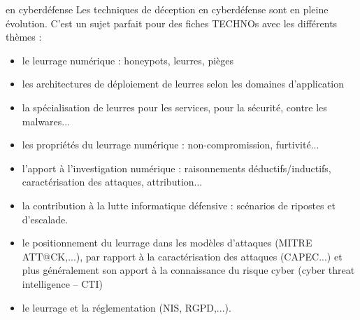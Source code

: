 \begin{warningbox}{ en cyberdéfense}
Les techniques de déception en cyberdéfense sont en pleine évolution. C'est un sujet parfait pour des fiches TECHNOs avec les différents thèmes  :
\begin{itemize}
  \item le leurrage numérique : honeypots, leurres, pièges
  \item 	les architectures de déploiement de leurres selon les domaines d'application
  \item 	la spécialisation de leurres pour les services, pour la sécurité, contre les malwares...
  \item 	les propriétés du leurrage numérique :  non-compromission,  furtivité...
  \item 	l'apport à l'investigation numérique : raisonnements déductifs/inductifs, caractérisation des attaques, attribution...
  \item 	la contribution à la lutte informatique défensive : scénarios de ripostes et d'escalade.
  \item 	le positionnement du leurrage dans les modèles d'attaques (MITRE ATT@CK,...), par rapport à la caractérisation des attaques (CAPEC...) et plus généralement son apport à la connaissance du risque cyber (cyber threat intelligence – CTI)
  \item 	le leurrage et la réglementation (NIS, RGPD,...).
\end{itemize}

\end{warningbox}









